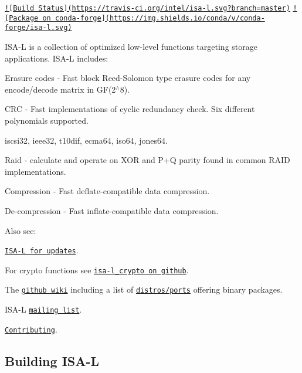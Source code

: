 \href{https://travis-ci.org/intel/isa-l}{\tt !\mbox{[}Build Status\mbox{]}(https\-://travis-\/ci.\-org/intel/isa-\/l.\-svg?branch=master)} \href{https://anaconda.org/conda-forge/isa-l}{\tt !\mbox{[}Package on conda-\/forge\mbox{]}(https\-://img.\-shields.\-io/conda/v/conda-\/forge/isa-\/l.\-svg)}

I\-S\-A-\/\-L is a collection of optimized low-\/level functions targeting storage applications. I\-S\-A-\/\-L includes\-:
\begin{DoxyItemize}
\item Erasure codes -\/ Fast block Reed-\/\-Solomon type erasure codes for any encode/decode matrix in G\-F(2$^\wedge$8).
\item C\-R\-C -\/ Fast implementations of cyclic redundancy check. Six different polynomials supported.
\begin{DoxyItemize}
\item iscsi32, ieee32, t10dif, ecma64, iso64, jones64.
\end{DoxyItemize}
\item Raid -\/ calculate and operate on X\-O\-R and P+\-Q parity found in common R\-A\-I\-D implementations.
\item Compression -\/ Fast deflate-\/compatible data compression.
\item De-\/compression -\/ Fast inflate-\/compatible data compression.
\end{DoxyItemize}

Also see\-:
\begin{DoxyItemize}
\item \href{https://github.com/intel/isa-l}{\tt I\-S\-A-\/\-L for updates}.
\item For crypto functions see \href{https://github.com/intel/isa-l_crypto}{\tt isa-\/l\-\_\-crypto on github}.
\item The \href{https://github.com/intel/isa-l/wiki}{\tt github wiki} including a list of \href{https://github.com/intel/isa-l/wiki/Ports--Repos}{\tt distros/ports} offering binary packages.
\item I\-S\-A-\/\-L \href{https://lists.01.org/hyperkitty/list/isal@lists.01.org/}{\tt mailing list}.
\item \href{CONTRIBUTING.md}{\tt Contributing}.
\end{DoxyItemize}

\subsection*{Building I\-S\-A-\/\-L }

